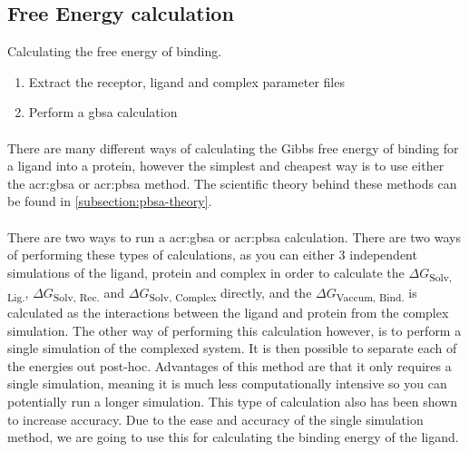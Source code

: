 \subsection{Free Energy calculation}
    \begin{task}[label=task:Energy]{Calculating the free energy of binding.}
        \begin{enumerate}[label=(\alph*)]
            \item Extract the receptor, ligand and complex parameter files
            \item Perform a gbsa calculation
        \end{enumerate}
    \end{task}

    \paragraph{}
    There are many different ways of calculating the Gibbs free energy of binding for a ligand into a protein\cite{Cournia2017RelativeConsiderations, Genheden2012ComparisonEnergies, Singh2010AbsoluteInteractions, P.Bhati2016RapidIntegration, Wang2019End-PointDesign}, however the simplest and cheapest way is to use either the \gls{acr:gbsa} or \gls{acr:pbsa} method.\cite{Wang2019End-PointDesign} The scientific theory behind these methods can be found in \cref{subsection:pbsa-theory}.

    \paragraph{}
    There are two ways to run a \gls{acr:gbsa}  or \gls{acr:pbsa} calculation. There are two ways of performing these types of calculations, as you can either 3 independent simulations of the ligand, protein and complex in order to calculate the $\Delta G$\textsubscript{Solv, Lig.}, $\Delta G$\textsubscript{Solv, Rec.} and $\Delta G$\textsubscript{Solv, Complex} directly, and the $\Delta G$\textsubscript{Vaccum, Bind.} is calculated as the interactions between the ligand and protein from the complex simulation. The other way of performing this calculation however, is to perform a single simulation of the complexed system. It is then possible to separate each of the energies out post-hoc. Advantages of this method are that it only requires a single simulation, meaning it is much less computationally intensive so you can potentially run a longer simulation. This type of calculation also has been shown to increase accuracy. Due to the ease and accuracy of the single simulation method, we are going to use this for calculating the binding energy of the ligand. 

